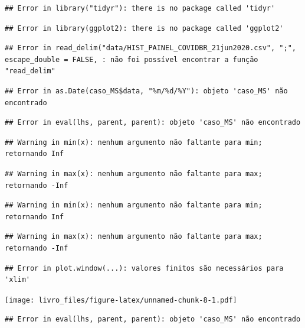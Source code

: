 \documentclass[
]{book}
\begin{document}
\begin{verbatim}
## Error in library("tidyr"): there is no package called 'tidyr'
\end{verbatim}

\begin{verbatim}
## Error in library(ggplot2): there is no package called 'ggplot2'
\end{verbatim}

\begin{verbatim}
## Error in read_delim("data/HIST_PAINEL_COVIDBR_21jun2020.csv", ";", escape_double = FALSE, : não foi possível encontrar a função "read_delim"
\end{verbatim}

\begin{verbatim}
## Error in as.Date(caso_MS$data, "%m/%d/%Y"): objeto 'caso_MS' não encontrado
\end{verbatim}

\begin{verbatim}
## Error in eval(lhs, parent, parent): objeto 'caso_MS' não encontrado
\end{verbatim}

\begin{verbatim}
## Warning in min(x): nenhum argumento não faltante para min; retornando Inf
\end{verbatim}

\begin{verbatim}
## Warning in max(x): nenhum argumento não faltante para max; retornando -Inf
\end{verbatim}

\begin{verbatim}
## Warning in min(x): nenhum argumento não faltante para min; retornando Inf
\end{verbatim}

\begin{verbatim}
## Warning in max(x): nenhum argumento não faltante para max; retornando -Inf
\end{verbatim}

\begin{verbatim}
## Error in plot.window(...): valores finitos são necessários para 'xlim'
\end{verbatim}

\texttt{[image: livro\_files/figure-latex/unnamed-chunk-8-1.pdf]}

\begin{verbatim}
## Error in eval(lhs, parent, parent): objeto 'caso_MS' não encontrado
\end{verbatim}
\end{document}
